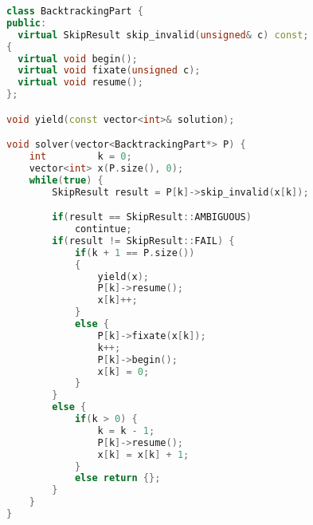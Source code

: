     \begin{lstlisting}[language=C++]
class BacktrackingPart {
public:
  virtual SkipResult skip_invalid(unsigned& c) const;
{
  virtual void begin();
  virtual void fixate(unsigned c);
  virtual void resume();
};

void yield(const vector<int>& solution);

void solver(vector<BacktrackingPart*> P) {
    int         k = 0;
    vector<int> x(P.size(), 0);
    while(true) {
        SkipResult result = P[k]->skip_invalid(x[k]);

        if(result == SkipResult::AMBIGUOUS)
            contintue;
        if(result != SkipResult::FAIL) {
            if(k + 1 == P.size())
            {
                yield(x);
                P[k]->resume();
                x[k]++;
            }
            else {
                P[k]->fixate(x[k]);
                k++;
                P[k]->begin();
                x[k] = 0;
            }
        }
        else {
            if(k > 0) {
                k = k - 1;
                P[k]->resume();
                x[k] = x[k] + 1;
            }
            else return {};
        }
    }
}
    \end{lstlisting}